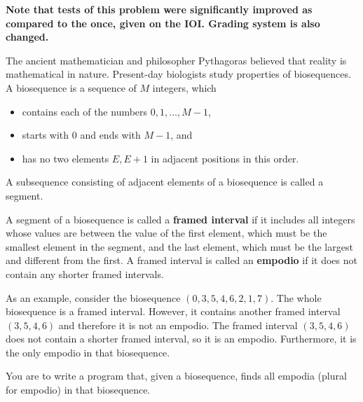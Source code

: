 {\bf Note that tests of this problem were significantly improved as compared to the once, given on the IOI. Grading system is also changed. }

The ancient mathematician and philosopher Pythagoras believed that reality is mathematical in nature.
Present-day biologists study properties of biosequences.
A biosequence is a sequence of $M$ integers, which
\begin{itemize}
\item contains each of the numbers $0,1, \ldots ,M-1$,
\item starts with $0$ and ends with $M-1$, and
\item has no two elements $E,E+1$ in adjacent positions in this order.
\end{itemize}

A subsequence consisting of adjacent elements of a biosequence is called a segment.

A segment of a biosequence is called a \textbf{framed interval} if it includes all integers whose values are between the value of the first element, which must be the smallest element in the segment, and the last element, which must be the largest and different from the first.
A framed interval is called an \textbf{empodio} if it does not contain any shorter framed intervals.

As an example, consider the biosequence $(0,3,5,4,6,2,1,7)$.
The whole biosequence is a framed interval.
However, it contains another framed interval $(3,5,4,6)$ and therefore it is not an empodio.
The framed interval $(3,5,4,6)$ does not contain a shorter framed interval, so it is an empodio.
Furthermore, it is the only empodio in that biosequence.

You are to write a program that, given a biosequence, finds all empodia (plural for empodio) in that biosequence. 
